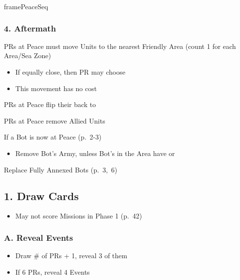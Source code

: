 \documentclass[10pt]{article}
\newlength{\fhPeaceSeq} \setlength\fhPeaceSeq{32\baselineskip}
\begin{document}
\begin{dynamiccontents*}{framePeaceSeq}
\begin{eubox}{\fhPeaceSeq}
\begin{multicols}{2}
		\subsubsection*{4. Aftermath}
		\begin{itemize}
			\item PRs at Peace must move Units to the nearest Friendly Area (count 1 for each Area/Sea Zone)
			\begin{itemize}
				\item If equally close, then PR may choose
				\item This movement has no cost
			\end{itemize}
			\item PRs at Peace flip their \activeallies back to \alliance
			\item PRs at Peace remove Allied Units
			{\botrules
			\item If a Bot is now at Peace (p.~2-3)
			\begin{itemize}
				\item Remove Bot's Army, unless Bot's \towns in the Area have \unrest or \rebeltown
			\end{itemize}
			\item Replace Fully Annexed Bots (p.~3,~6)
			}
		\end{itemize}
	\end{multicols}
\end{eubox}\end{dynamiccontents*}

\subsection*{1. Draw Cards}
\begin{itemize}
	\item May not score Missions in Phase 1 (p.~42)
\end{itemize}
\subsubsection*{A. Reveal Events}
\begin{itemize}
	\item Draw \# of PRs + 1, reveal 3 of them
\end{itemize}
\begin{itemize}
	\item If 6 PRs, reveal 4 Events
\end{itemize}
\end{document}
